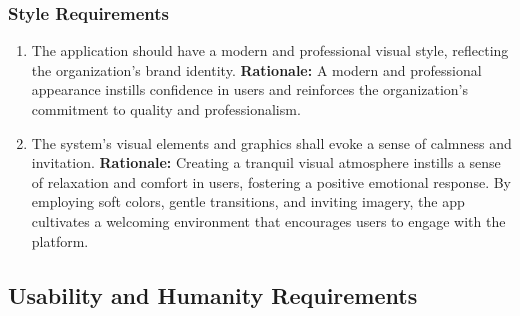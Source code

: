 \documentclass[]{article}
\begin{document}
\subsubsection{Style Requirements}
\label{ssub:style_requirements}
\begin{enumerate}[{LF-S}1. ]
	\item The application should have a modern and professional visual style, reflecting the organization's brand identity. \newline
	      \textbf{Rationale:} A modern and professional appearance instills confidence in users and reinforces the organization's commitment to quality and professionalism.
	\item The system's visual elements and graphics shall evoke a sense of calmness and invitation. \newline
	      \textbf{Rationale:} Creating a tranquil visual atmosphere instills a sense of relaxation and comfort in users, fostering a positive emotional response. By employing soft colors, gentle transitions, and inviting imagery, the app cultivates a welcoming environment that encourages users to engage with the platform.
\end{enumerate}


\subsection{Usability and Humanity Requirements}
\label{sub:usability_and_humanity_requirements}
\end{document}
